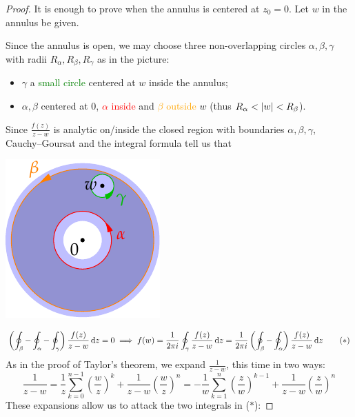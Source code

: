 \begin{proof}
	It is enough to prove when the annulus is centered at $z_0=0$. Let $w$ in the annulus be given.\par
	\begin{minipage}[t]{0.73\linewidth}\vspace{-3pt}
		Since the annulus is open, we may choose three non-overlapping circles $\alpha,\beta,\gamma$ with radii $R_\alpha,R_\beta,R_\gamma$ as in the picture:
		\begin{itemize}
		  \item $\gamma$ a \textcolor{Green}{small circle} centered at $w$ inside the annulus;
		  \item $\alpha,\beta$ centered at 0, \textcolor{red}{$\alpha$ inside} and \textcolor{orange}{$\beta$ outside} $w$ (thus $R_\alpha<\left| w\right|<R_\beta$). 
		\end{itemize}
		Since $\frac{f(z)}{z-w}$ is analytic on/inside the closed region with boundaries $\alpha,\beta,\gamma$, Cauchy--Goursat and the integral formula tell us that
	\end{minipage}
	\hfill
	\begin{minipage}[t]{0.25\linewidth}\vspace{-4pt}
		\flushright\includegraphics[scale=0.95]{laurent4}
	\end{minipage}\par
	\[
		\left(\oint_\beta-\oint_\alpha-\oint_\gamma\right)\frac{f(z)}{z-w}\,{\mathrm{d} z}=0\implies f(w)=\frac 1{2\pi i}\oint_\gamma\frac{f(z)}{z-w}\,{\mathrm{d} z} =\frac 1{2\pi i}\left(\oint_\beta-\oint_\alpha\right)\frac{f(z)}{z-w}\,{\mathrm{d} z}
		\tag{$\ast$}
	\]
	As in the proof of Taylor's theorem, we expand $\frac 1{z-w}$, this time in two ways:
	\[
		\frac 1{z-w}
		=\frac 1z\sum_{k=0}^{n-1}\left(\frac wz\right)^k +\frac 1{z-w}\left(\frac wz\right)^n 
		=-\frac 1w\sum_{k=1}^{n}\left(\frac zw\right)^{k-1} +\frac 1{z-w}\left(\frac zw\right)^n
	\]
	These expansions allow us to attack the two integrals in ($\ast$):

\end{proof}
